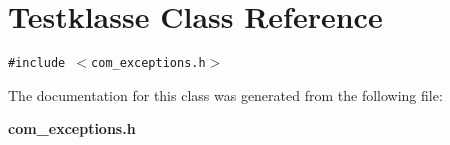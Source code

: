 \section{Testklasse Class Reference}
\label{classTestklasse}
{\tt \#include $<$com\_\-exceptions.h$>$}



The documentation for this class was generated from the following file:\begin{CompactItemize}
\item 
{\bf com\_\-exceptions.h}\end{CompactItemize}
